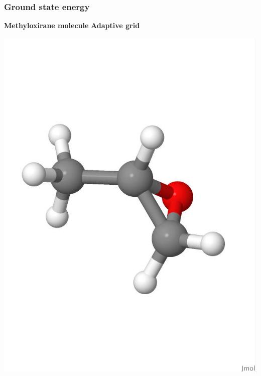 \begin{frame}
\frametitle{Ground state energy}
\scriptsize

\centering
\textbf{Methyloxirane molecule}
\hspace{30mm}
\textbf{Adaptive grid}
\begin{minipage}{0.5\textwidth}
\centering
\includegraphics[scale=0.15, viewport = 0 180 550 650, clip]{figures/methyloxirane_white.jpg}
\end{minipage}%
\begin{minipage}{0.5\textwidth}
\centering

\end{minipage}
\end{frame}
